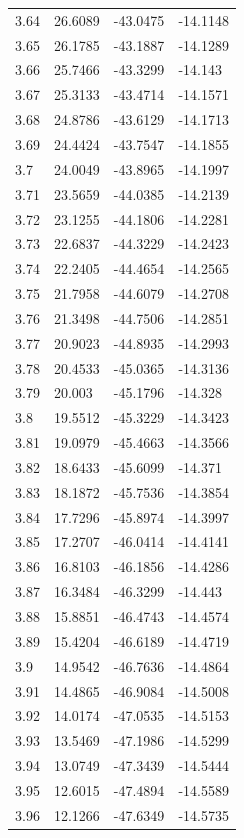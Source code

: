 \begin{tabular}{llll}
3.64 & 26.6089 & -43.0475 & -14.1148 \\
3.65 & 26.1785 & -43.1887 & -14.1289 \\
3.66 & 25.7466 & -43.3299 & -14.143 \\
3.67 & 25.3133 & -43.4714 & -14.1571 \\
3.68 & 24.8786 & -43.6129 & -14.1713 \\
3.69 & 24.4424 & -43.7547 & -14.1855 \\
3.7 & 24.0049 & -43.8965 & -14.1997 \\
3.71 & 23.5659 & -44.0385 & -14.2139 \\
3.72 & 23.1255 & -44.1806 & -14.2281 \\
3.73 & 22.6837 & -44.3229 & -14.2423 \\
3.74 & 22.2405 & -44.4654 & -14.2565 \\
3.75 & 21.7958 & -44.6079 & -14.2708 \\
3.76 & 21.3498 & -44.7506 & -14.2851 \\
3.77 & 20.9023 & -44.8935 & -14.2993 \\
3.78 & 20.4533 & -45.0365 & -14.3136 \\
3.79 & 20.003 & -45.1796 & -14.328 \\
3.8 & 19.5512 & -45.3229 & -14.3423 \\
3.81 & 19.0979 & -45.4663 & -14.3566 \\
3.82 & 18.6433 & -45.6099 & -14.371 \\
3.83 & 18.1872 & -45.7536 & -14.3854 \\
3.84 & 17.7296 & -45.8974 & -14.3997 \\
3.85 & 17.2707 & -46.0414 & -14.4141 \\
3.86 & 16.8103 & -46.1856 & -14.4286 \\
3.87 & 16.3484 & -46.3299 & -14.443 \\
3.88 & 15.8851 & -46.4743 & -14.4574 \\
3.89 & 15.4204 & -46.6189 & -14.4719 \\
3.9 & 14.9542 & -46.7636 & -14.4864 \\
3.91 & 14.4865 & -46.9084 & -14.5008 \\
3.92 & 14.0174 & -47.0535 & -14.5153 \\
3.93 & 13.5469 & -47.1986 & -14.5299 \\
3.94 & 13.0749 & -47.3439 & -14.5444 \\
3.95 & 12.6015 & -47.4894 & -14.5589 \\
3.96 & 12.1266 & -47.6349 & -14.5735 \\

\end{tabular}
